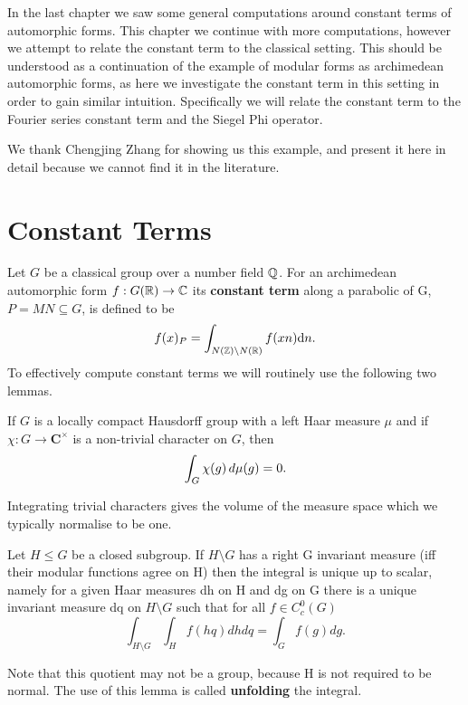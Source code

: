 \label{ch:sigel-phi}
In the last chapter we saw some general computations around constant terms of automorphic forms. This chapter we continue with more computations, however we attempt to relate the constant term to the classical setting. This should be understood as a continuation of the example of modular forms as archimedean automorphic forms, as here we investigate the constant term in this setting in order to gain similar intuition. Specifically we will relate the constant term to the Fourier series constant term and the Siegel Phi operator. 

We thank Chengjing Zhang for showing us this example, and present it here in detail because we cannot find it in the literature.



\section{Constant Terms}
Let \(G\) be a classical group over a number field \(\Q\). For an archimedean automorphic form \(f: G(\R) \to \C\) its \textbf{constant term } along a parabolic of G, \(P=MN\subseteq G\), is defined to be \cite[8.6]{getzIntroductionAutomorphicRepresentations2024}
\[f(x)_P = \int_{N(\Z)\backslash N(\R)}f(xn) \mathrm{d}n.\]
To effectively compute constant terms we will routinely use the following two lemmas.

\begin{Theorem}\label{integrate_unitary_char}
	If \(G\) is a locally compact Hausdorff group with a left Haar measure \(\mu\) and if \(\chi\colon G\to \mathbf C^\times\) is a non-trivial character on \(G\), then
	\[ \int^{}_{G}\chi(g)\,d\mu(g) = 0. \]
\end{Theorem}
Integrating trivial characters gives the volume of the measure space which we typically normalise to be one.

\begin{Theorem}
	Let \(H\leq G\) be a closed subgroup. If \(H\setminus G\) has a right G invariant measure (iff their modular functions agree on H) then the integral is unique up to scalar, namely for a given Haar measures dh on H and dg on G there is a unique invariant measure dq on \(H\setminus G\) such that for all \(f\in C_c^0(G)\)
	\[\int_{H\setminus G}\int_H f(hq)dhdq = \int_G f(g) dg.\]
\end{Theorem}
Note that this quotient may not be a group, because H is not required to be normal. The use of this lemma is called \textbf{unfolding} the integral.


